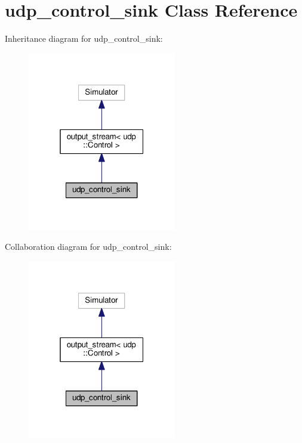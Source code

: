 \hypertarget{classudp__control__sink}{}\section{udp\+\_\+control\+\_\+sink Class Reference}
\label{classudp__control__sink}


Inheritance diagram for udp\+\_\+control\+\_\+sink\+:
\nopagebreak
\begin{figure}[H]
\begin{center}
\leavevmode
\includegraphics[width=184pt]{classudp__control__sink__inherit__graph}
\end{center}
\end{figure}


Collaboration diagram for udp\+\_\+control\+\_\+sink\+:
\nopagebreak
\begin{figure}[H]
\begin{center}
\leavevmode
\includegraphics[width=184pt]{classudp__control__sink__coll__graph}
\end{center}
\end{figure}
